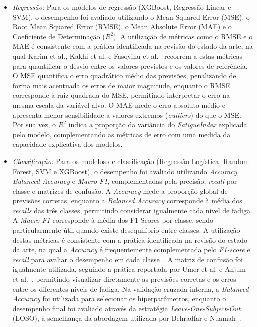 \begin{itemize} 
\item \textit{Regressão:} Para os modelos de regressão (XGBoost, Regressão Linear e SVM), o desempenho foi avaliado utilizando o Mean Squared Error (MSE), o Root Mean Squared Error (RMSE), o Mean Absolute Error (MAE) e o Coeficiente de Determinação ($R^2$). A utilização de métricas como o RMSE e o MAE é consistente com a prática identificada na revisão do estado da arte, na qual Karim et al., Kakhi et al. e Fasoyinu et al.~\cite{karim2025,kakhi2025,fasoyinu2025} recorrem a estas métricas para quantificar o desvio entre os valores previstos e os valores de referência. O MSE quantifica o erro quadrático médio das previsões, penalizando de forma mais acentuada os erros de maior magnitude, enquanto o RMSE corresponde à raiz quadrada do MSE, permitindo interpretar o erro na mesma escala da variável alvo. O MAE mede o erro absoluto médio e apresenta menor sensibilidade a valores extremos (\textit{outliers}) do que o MSE. Por sua vez, o $R^2$ indica a proporção da variância do \textit{FatigueIndex} explicada pelo modelo, complementando as métricas de erro com uma medida da capacidade explicativa dos modelos.

\item \textit{Classificação:} Para os modelos de classificação (Regressão Logística, Random Forest, SVM e XGBoost), o desempenho foi avaliado utilizando \textit{Accuracy}, \textit{Balanced Accuracy} e \textit{Macro-F1}, complementadas pela precisão, \textit{recall} por classe e matrizes de confusão. A \textit{Accuracy} mede a proporção global de previsões corretas, enquanto a \textit{Balanced Accuracy} corresponde à média dos \textit{recalls} das três classes, permitindo considerar igualmente cada nível de fadiga. A \textit{Macro-F1} corresponde à média dos F1-Scores por classe, sendo particularmente útil quando existe desequilíbrio entre classes. A utilização destas métricas é consistente com a prática identificada na revisão do estado da arte, na qual a \textit{Accuracy} é frequentemente complementada pelo \textit{F1-score} e \textit{recall} para avaliar o desempenho em cada classe~\cite{fasoyinu2025,wang2024,cheng2025,goutham2025,albarran2025}. A matriz de confusão foi igualmente utilizada, seguindo a prática reportada por Umer et al. e Anjum et al.~\cite{umer2025,anjum2025}, permitindo visualizar diretamente as previsões corretas e os erros entre os diferentes níveis de fadiga. Na validação cruzada interna, a \textit{Balanced Accuracy} foi utilizada para selecionar os hiperparâmetros, enquanto o desempenho final foi avaliado através da estratégia \textit{Leave-One-Subject-Out} (LOSO), à semelhança da abordagem utilizada por Behradfar e Nuamah~\cite{behradfar2025}.
\end{itemize}

